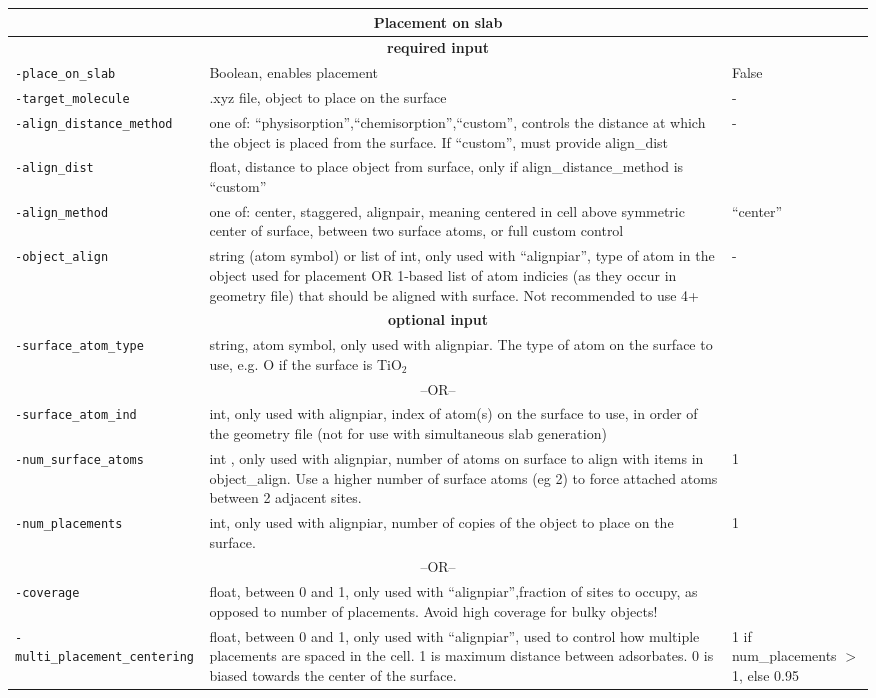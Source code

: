 \begin{tabular}{|p{5.25cm}|p{8cm}|p{2.75cm}|}
\hline
\multicolumn{3}{|c|}{\Large \textbf{Placement on slab}}\\ \hline                        
\multicolumn{3}{|c|}{ \textbf{required input}}\\ \hline                        
\texttt{-place\_on\_slab} & Boolean, enables placement & False \\
\texttt{-target\_molecule} & .xyz file, object to place on the surface
 & - \\
\texttt{-align\_distance\_method} & one of:  “physisorption”,“chemisorption”,“custom”, controls the distance at which the object is placed from the surface. If “custom”, must provide align\_dist & - \\
\texttt{-align\_dist  } & float, distance to place object from surface, only if align\_distance\_method is “custom” &  \\

\texttt{-align\_method} & one of: center, staggered, alignpair, meaning centered in cell above symmetric center of surface, between two surface atoms, or  full custom control
 &   “center”\\

\texttt{-object\_align} & string (atom symbol) or list of int, only used with “alignpiar”, type of atom  in the object used for placement OR 1-based list of atom indicies (as they occur in geometry file) that should be aligned with surface. Not recommended to use 4+ & -\\
\multicolumn{3}{|c|}{ \textbf{optional input}}\\ \hline                          

\texttt{-surface\_atom\_type } & string, atom symbol, only used with alignpiar. The type of atom on the surface to use, e.g. O if the surface is TiO$_2$ &  \\
\multicolumn{3}{|c|}{ {--OR--}}\\  
\texttt{-surface\_atom\_ind } & int, only used with alignpiar, index of atom(s) on the surface to use, in order of the geometry file (not for use with simultaneous slab generation)  &  \\
\texttt{-num\_surface\_atoms } & 
int , only used with alignpiar, number of atoms on surface to align with items in object\_align.  Use a higher number of surface atoms (eg 2) to force attached atoms between 2 adjacent sites.   &  1\\
\texttt{-num\_placements } & int, only used with alignpiar, number of copies of the object to place on the surface. & 1  \\
\multicolumn{3}{|c|}{ {--OR--}}\\  
\texttt{-coverage} & 
float, between 0 and 1, only used with “alignpiar”,fraction of sites to occupy, as opposed to number of placements. Avoid high coverage for bulky objects! &  \\
\texttt{-multi\_placement\_centering} & float, between 0 and 1, only used with “alignpiar”, used to control how multiple placements are spaced in the cell. 1 is maximum distance between adsorbates. 0 is biased towards the center of the surface.  &  1 if num\_placements $>$ 1, else 0.95 \\
\hline
\end{tabular}
